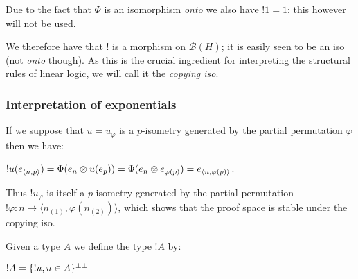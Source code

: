 Due to the fact that \(\Phi\) is an isomorphism \emph{onto} we also have
\(!1=1\); this however will not be used.

We therefore have that \(!\) is a morphism on \(\mathcal{B}(H)\); it is
easily seen to be an iso (not \emph{onto} though). As this is the
crucial ingredient for interpreting the structural rules of linear
logic, we will call it the \emph{copying iso}.

\subsubsection{Interpretation of
exponentials}\label{interpretation-of-exponentials}

If we suppose that \(u = u_\varphi\) is a \(p\)-isometry generated by
the partial permutation \(\varphi\) then we have:

\begin{description}
\tightlist
\item[]
\(!u(e_{\langle n,p\rangle}) = \Phi(e_n\otimes u(e_p)) = \Phi(e_n\otimes e_{\varphi(p)}) = e_{\langle n,\varphi(p)\rangle}\).
\end{description}

Thus \(!u_\varphi\) is itself a \(p\)-isometry generated by the partial
permutation
\(!\varphi:n\mapsto \langle n_{(1)}, \varphi(n_{(2)})\rangle\), which
shows that the proof space is stable under the copying iso.

Given a type \(A\) we define the type \(!A\) by:

\begin{description}
\tightlist
\item[]
\(!A = \{!u, u\in A\}^{\bot\bot}\)
\end{description}


